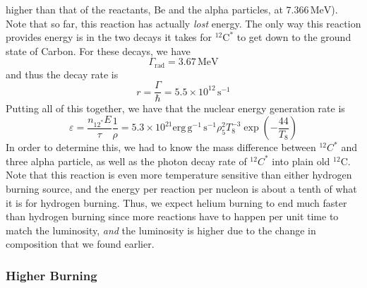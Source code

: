 \documentclass[10pt]{article}
\numberwithin{equation}{section}
\begin{document}
    higher than that of the reactants, Be and the alpha particles, at
    $7.366\,\mathrm{MeV}$). Note that so far, this reaction has
    actually \emph{lost} energy. The only way this reaction provides
    energy is in the two decays it takes for ${}^{12}\mathrm{C}^*$ to
    get down to the ground state of Carbon. For these decays, we have
    \begin{equation}
      \label{eq:272}
      \Gamma_{\mathrm{rad}}=3.67\,\mathrm{MeV}
    \end{equation}
    and thus the decay rate is
    \begin{equation}
      \label{eq:273}
      r=\frac{\Gamma}{\hbar}=5.5 \times 10^{12}\,\mathrm{s^{-1}}
    \end{equation}
    Putting all of this together, we have that the nuclear energy
    generation rate is
    \begin{equation}
      \label{eq:274}
      \varepsilon = \frac{n_{12^*}E}{\tau}\frac{1}{\rho}=5.3\times 10^{21}\mathrm{erg\,g^{-1}\,s^{-1}}\rho_5^2T_8^{-3}\exp\left(-\frac{44}{T_8}\right)
    \end{equation}
    In order to determine this, we had to know the mass difference
    between ${}^{12}C^*$ and three alpha particle, as well as the
    photon decay rate of ${}^{12}C^*$ into plain old
    $^{12}\mathrm{C}$. Note that this reaction is even more
    temperature sensitive than either hydrogen burning source, and the
    energy per reaction per nucleon is about a tenth of what it is for
    hydrogen burning. Thus, we expect helium burning to end much
    faster than hydrogen burning since more reactions have to happen
    per unit time to match the luminosity, \emph{and} the luminosity
    is higher due to the change in composition that we found earlier.\\
    
    \subsubsection{Higher Burning}
    \label{sec:higher-burning-1}
\end{document}
